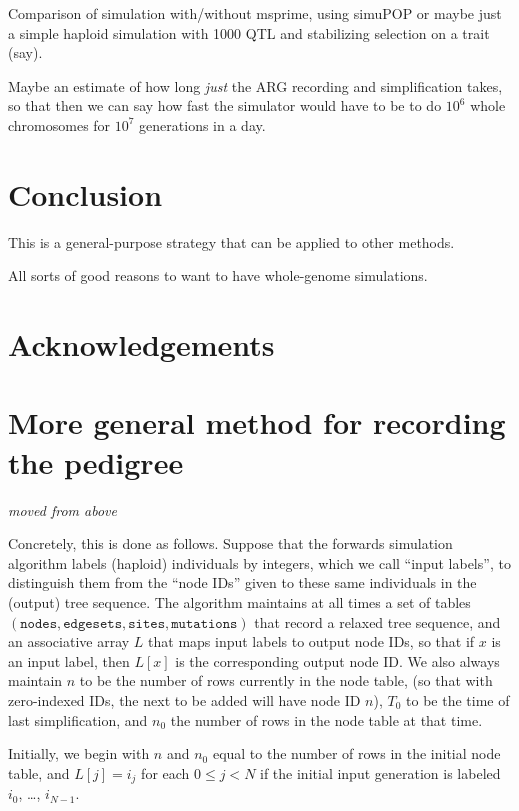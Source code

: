 \documentclass{article}
\newcommand{\nodes}{\texttt{nodes}}
\newcommand{\edgesets}{\texttt{edgesets}}
\newcommand{\sites}{\texttt{sites}}
\newcommand{\mutations}{\texttt{mutations}}
\newcommand{\plr}[1]{{\em \color{blue} #1}}
\begin{document}
Comparison of simulation with/without msprime, using simuPOP
or maybe just a simple haploid simulation with 1000 QTL and stabilizing selection on a trait (say).

Maybe an estimate of how long \emph{just} the ARG recording and simplification takes,
so that then we can say how fast the simulator would have to be to do $10^6$ whole chromosomes for $10^7$ generations
in a day.

\section*{Conclusion}

This is a general-purpose strategy that can be applied to other methods.

All sorts of good reasons to want to have whole-genome simulations.

\section*{Acknowledgements}




\appendix

\section{More general method for recording the pedigree}

\plr{moved from above}

Concretely, this is done as follows.
Suppose that the forwards simulation algorithm labels (haploid) individuals by integers,
which we call ``input labels'',
to distinguish them from the ``node IDs'' given to these same individuals in the (output) tree sequence.
The algorithm maintains at all times a set of tables $(\nodes, \edgesets, \sites, \mutations)$
that record a relaxed tree sequence,
and an associative array $L$ that maps input labels to output node IDs, so that if $x$ is an input label,
then $L[x]$ is the corresponding output node ID.
We also always maintain $n$ to be the number of rows currently in the node table,
(so that with zero-indexed IDs, the next to be added will have node ID $n$),
$T_0$ to be the time of last simplification,
and $n_0$ the number of rows in the node table at that time.

Initially, we begin with $n$ and $n_0$ equal to the number of rows in the initial node table,
and $L[j] = i_j$ for each $0 \le j < N$ if the initial input generation is labeled
$i_0$, \ldots, $i_{N-1}$.
\end{document}
